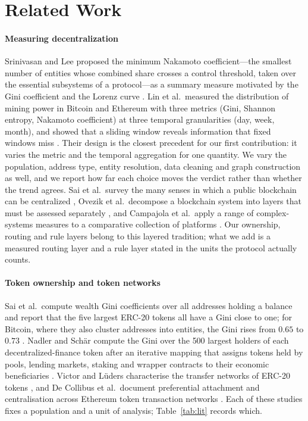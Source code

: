 \section{Related Work}
\label{sec:related}

\paragraph{Measuring decentralization}
Srinivasan and Lee proposed the minimum Nakamoto coefficient---the smallest
number of entities whose combined share crosses a control threshold, taken
over the essential subsystems of a protocol---as a summary measure motivated
by the Gini coefficient and the Lorenz curve \cite{srinivasan2017quantifying}.
Lin et al.\ measured the distribution of mining power in Bitcoin and Ethereum
with three metrics (Gini, Shannon entropy, Nakamoto coefficient) at three
temporal granularities (day, week, month), and showed that a sliding window
reveals information that fixed windows miss \cite{lin2021measuring}. Their
design is the closest precedent for our first contribution: it varies the
metric and the temporal aggregation for one quantity. We vary the
population, address type, entity resolution, data cleaning and graph
construction as well, and we report how far each choice moves the verdict
rather than whether the trend agrees. Sai et al.\ survey the many senses in
which a public blockchain can be centralized \cite{sai2021taxonomy}, Ovezik
et al.\ decompose a blockchain system into layers that must be assessed
separately \cite{ovezik2022sok}, and Campajola et al.\ apply a range of
complex-systems measures to a comparative collection of platforms
\cite{campajola2022evolution}. Our ownership, routing and rule layers belong
to this layered tradition; what we add is a measured routing layer and a
rule layer stated in the units the protocol actually counts.

\paragraph{Token ownership and token networks}
Sai et al.\ compute wealth Gini coefficients over all addresses holding a
balance and report that the five largest ERC-20 tokens all have a Gini close
to one; for Bitcoin, where they also cluster addresses into entities, the
Gini rises from $0.65$ to $0.73$ \cite{sai2021wealth}. Nadler and Sch\"ar
compute the Gini over the 500 largest holders of each decentralized-finance
token after an iterative mapping that assigns tokens held by pools, lending
markets, staking and wrapper contracts to their economic beneficiaries
\cite{nadler2022defi}. Victor and L\"uders characterise the transfer networks
of ERC-20 tokens \cite{victor2019erc20}, and De Collibus et al.\ document
preferential attachment and centralisation across Ethereum token transaction
networks \cite{decollibus2024patterns}. Each of these studies fixes a
population and a unit of analysis; Table~\ref{tab:lit} records which.

